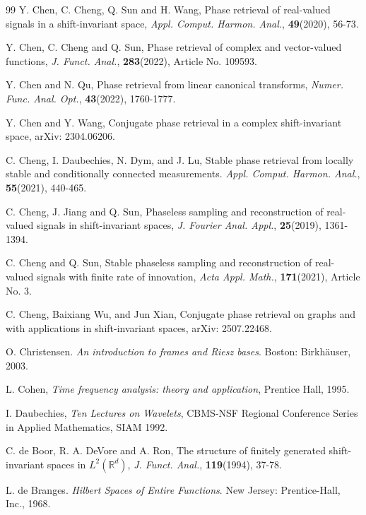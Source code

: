 \documentclass[11pt,oneside,reqno]{amsart}
\numberwithin{equation}{section}
\def\R{ {\mathbb R} }
\begin{document}
\begin{thebibliography}{99}
Y. Chen, C. Cheng, Q. Sun and H. Wang, Phase retrieval of real-valued signals in a shift-invariant space, {\em Appl. Comput. Harmon. Anal.}, {\bf 49}(2020), 56-73.

Y. Chen, C. Cheng and Q. Sun, Phase retrieval of complex and vector-valued functions, {\em J. Funct. Anal.}, {\bf 283}(2022), Article No. 109593.

Y. Chen and N. Qu, Phase retrieval from linear canonical transforms, {\em Numer. Func. Anal. Opt.}, {\bf 43}(2022), 1760-1777.

Y. Chen and Y. Wang, Conjugate phase retrieval in a complex shift-invariant space, arXiv:  2304.06206.


C. Cheng, I. Daubechies, N. Dym, and J. Lu,
Stable phase retrieval from locally stable and conditionally connected measurements.
{\em Appl. Comput. Harmon. Anal.},
{\bf 55}(2021),  440-465.


 C. Cheng, J. Jiang and Q. Sun, Phaseless sampling and reconstruction of real-valued signals in shift-invariant spaces, {\em J. Fourier Anal. Appl.}, {\bf 25}(2019),  1361-1394.

 C. Cheng and Q. Sun,  Stable phaseless sampling and reconstruction of real-valued signals with finite rate of innovation,
{\em  Acta Appl. Math.}, {\bf  171}(2021), Article No. 3.


 C. Cheng, Baixiang Wu, and Jun Xian,  Conjugate phase retrieval on graphs and with applications in shift-invariant spaces, arXiv: 2507.22468. 




 O. Christensen. {\em An introduction to frames and Riesz bases}. Boston: Birkh\"auser, 2003.





 L. Cohen, {\em Time frequency analysis: theory and application}, Prentice Hall, 1995.

 I. Daubechies, {\em Ten Lectures on Wavelets}, CBMS-NSF Regional Conference Series in Applied Mathematics, SIAM 1992.

C. de Boor, R. A. DeVore and A. Ron,
The structure of finitely generated shift-invariant
spaces in $L^2(\R^d)$, {\em J. Funct. Anal.},
{\bf 119}(1994),  37-78.

 L. de Branges. {\em Hilbert Spaces of Entire Functions}. New Jersey: Prentice-Hall, Inc., 1968.




\end{thebibliography}
\end{document}
